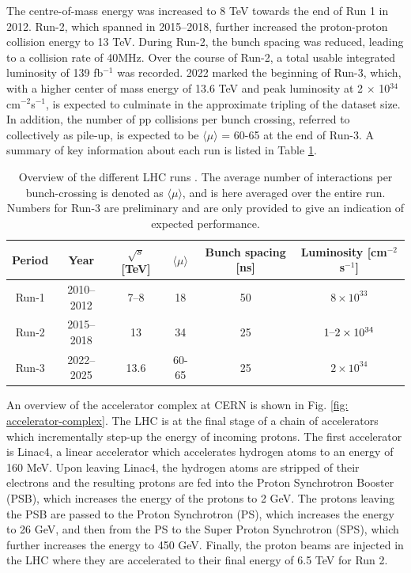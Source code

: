 The centre-of-mass energy was increased to 8 TeV towards the end of Run 1 in 2012. Run-2, which spanned in 2015–2018, further increased the proton-proton collision energy to 13 TeV. During Run-2, the bunch spacing was reduced, leading to a collision rate of 40MHz. Over the course of Run-2, a total usable integrated luminosity of 139 fb$^{−1}$ was recorded. 2022 marked the beginning of Run-3, which, with a higher center of mass energy of 13.6 TeV and peak luminosity at 2 $\times$ 10$^{34}$ cm$^{−2}$s$^{−1}$, is expected to culminate in the approximate tripling of the dataset size. In addition, the number of pp collisions per bunch crossing, referred to collectively as pile-up, is expected to be $\langle \mu \rangle$ = 60-65 at the end of Run-3. A summary of key information about each run is listed in Table \ref{tab:lhc-runs}.

\begin{table}[!htbp]
  \footnotesize\centering
  \setlength{\tabcolsep}{0.5em} %
  \begin{tabular}{cc|cccc}
      \toprule
      \textbf{Period} & \textbf{Year} & $\sqrt{s}$ [TeV] 
      & $\langle \mu \rangle$ & \textbf{Bunch spacing} [ns] & \textbf{Luminosity} [cm$^{−2}$s$^{−1}$] \\
      \hline
      Run-1 & 2010--2012 & \SIrange[range-phrase=--,range-units=single,range-exponents=combine]{7}{8}{} & 18 & 50 & $8 \times 10^{33}$ \\
      Run-2 & 2015--2018 & \SI{13  }{} & 34 & 25 & $1\textnormal{--}2 \times 10^{34}$ \\
      Run-3 & 2022--2025 & \SI{13.6}{} & 60-65 & 25 & $2 \times 10^{34}$ \\
      \bottomrule
  \end{tabular}
  \caption{
    Overview of the different \ac{LHC} runs \cite{atlas-lumi-run1,atlas-lumi-run2}.
    The average number of interactions per bunch-crossing is denoted as $\langle \mu \rangle$, and is here averaged over the entire run. Numbers for Run-3 are preliminary and are only provided to give an indication of expected performance.
  }
  \label{tab:lhc-runs}
\end{table}

An overview of the accelerator complex at CERN is shown in Fig. \ref{fig: accelerator-complex}. The \ac{LHC} is at the final stage of a chain of accelerators which incrementally step-up the energy of incoming protons. The first accelerator is Linac4, a linear accelerator which accelerates hydrogen atoms to an energy of 160 MeV. Upon leaving Linac4, the hydrogen atoms are stripped of their electrons and the resulting protons are fed into the Proton Synchrotron Booster (PSB), which increases the energy of the protons to 2 GeV. The protons leaving the PSB are passed to the Proton Synchrotron (PS), which increases the energy to 26 GeV, and then from the PS to the Super Proton Synchrotron (SPS), which further increases the energy to 450 GeV. Finally, the proton beams are injected in the \ac{LHC} where they are accelerated to their final energy of 6.5 TeV for Run 2.

